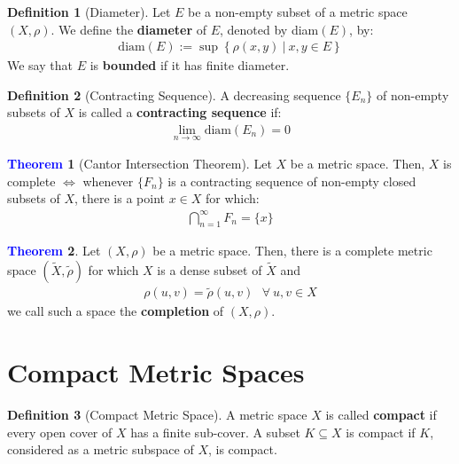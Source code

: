 \documentclass[11pt]{article}
\theoremstyle{definition}
\theoremstyle{definition}
\newcommand{\sets}[2]{ \left\{ #1\ |\ #2 \right\}}
\newtheorem{theorem}{\textcolor{blue}{Theorem}}
\theoremstyle{definition}
\newtheorem{definition}{\textcolor{OliveGreen}{Definition}}
\theoremstyle{remark}
\begin{document}
\begin{definition}[Diameter]
	Let $E$ be a non-empty subset of a metric space $(X, \rho)$. We define the \textbf{diameter} of $E$, denoted by diam$(E)$, by: 
	\begin{align}
		\text{diam}(E):= \sup \sets{\rho(x,y)}{x, y \in E}
	\end{align}
	We say that $E$ is \textbf{bounded} if it has finite diameter. 
\end{definition}

\begin{definition}[Contracting Sequence]
	A decreasing sequence $\{ E_n \}$ of non-empty subsets of $X$ is called a \textbf{contracting sequence} if: 
	\begin{align}
		\lim_{n \rightarrow \infty} \text{diam}(E_n) = 0 
	\end{align}
\end{definition}

\begin{theorem}[Cantor Intersection Theorem]
	Let $X$ be a metric space. Then, $X$ is complete $\iff$ whenever $\{ F_n \}$ is a contracting sequence of non-empty closed subsets of $X$, there is a point $x \in X$ for which: 
	\begin{align}
		\bigcap_{n=1}^\infty F_n = \{ x \}
	\end{align}
\end{theorem}

\begin{theorem}
	Let $(X, \rho)$ be a metric space. Then, there is a complete metric space $(\widetilde{X}, \tilde{\rho})$ for which $X$ is a dense subset of $\widetilde{X}$ and 
	\begin{align}
		\rho(u,v) = \tilde{\rho}(u,v) \text{ 		} \forall\ u, v \in X
	\end{align}
	we call such a space the \textbf{completion} of $(X, \rho)$. 
\end{theorem}

\section{Compact Metric Spaces}

\begin{definition}[Compact Metric Space]
	A metric space $X$ is called \textbf{compact} if every open cover of $X$ has a finite sub-cover. A subset $K \subseteq X$ is compact if $K$, considered as a metric subspace of $X$, is compact. 
\end{definition}
\end{document}
